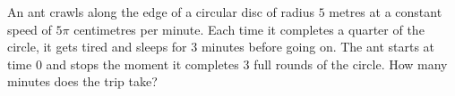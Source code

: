 An ant crawls along the edge of a circular disc of radius $5$ metres at a constant speed of $5\pi$ centimetres per minute. Each time it completes a quarter of the circle, it gets tired and sleeps for $3$ minutes before going on. The ant starts at time $0$ and stops the moment it completes $3$ full rounds of the circle. How many minutes does the trip take?
